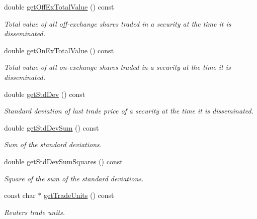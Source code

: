 \begin{CompactItemize}
double \hyperlink{classWombat_1_1MamdaTradeListener_0b0a3e74b09f916b4d202379842a243e}{get\-Off\-Ex\-Total\-Value} () const 
\begin{CompactList}\small\item\em Total value of all off-exchange shares traded in a security at the time it is disseminated. \item\end{CompactList}\item 
double \hyperlink{classWombat_1_1MamdaTradeListener_b9865f1c180226bf4f9c30efb9a996ab}{get\-On\-Ex\-Total\-Value} () const 
\begin{CompactList}\small\item\em Total value of all on-exchange shares traded in a security at the time it is disseminated. \item\end{CompactList}\item 
double \hyperlink{classWombat_1_1MamdaTradeListener_52d70de1c585fa3d02f31fb963b2788a}{get\-Std\-Dev} () const 
\begin{CompactList}\small\item\em Standard deviation of last trade price of a security at the time it is disseminated. \item\end{CompactList}\item 
double \hyperlink{classWombat_1_1MamdaTradeListener_3fa0c29ee90e004a4f9d56dccb1f9d28}{get\-Std\-Dev\-Sum} () const 
\begin{CompactList}\small\item\em Sum of the standard deviations. \item\end{CompactList}\item 
double \hyperlink{classWombat_1_1MamdaTradeListener_42d76e2ecd19afbf40e583c079221e02}{get\-Std\-Dev\-Sum\-Squares} () const 
\begin{CompactList}\small\item\em Square of the sum of the standard deviations. \item\end{CompactList}\item 
const char $\ast$ \hyperlink{classWombat_1_1MamdaTradeListener_c4b602c4ce2f49e81d4d20eef7d60711}{get\-Trade\-Units} () const 
\begin{CompactList}\small\item\em Reuters trade units. \item\end{CompactList}\item 

\end{CompactItemize}

